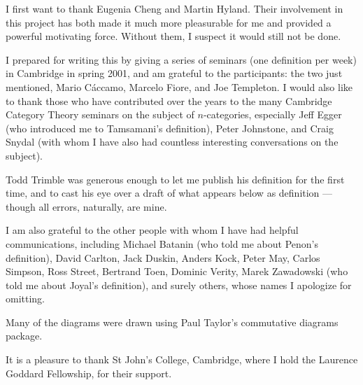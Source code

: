 I first want to thank Eugenia Cheng and Martin Hyland.  Their involvement in
this project has both made it much more pleasurable for me and provided a
powerful motivating force.  Without them, I suspect it would still not be
done.

I prepared for writing this by giving a series of seminars (one definition
per week) in Cambridge in spring 2001, and am grateful to the participants:
the two just mentioned, Mario C\'accamo, Marcelo Fiore, and Joe Templeton.  I
would also like to thank those who have contributed over the years to the
many Cambridge Category Theory seminars on the subject of $n$-categories,
especially Jeff Egger (who introduced me to Tamsamani's definition), Peter
Johnstone, and Craig Snydal (with whom I have also had countless interesting
conversations on the subject).

Todd Trimble was generous enough to let me publish his definition for the
first time, and to cast his eye over a draft of what appears below as
definition ---though all errors, naturally, are mine.

I am also grateful to the other people with whom I have had helpful
communications, including Michael Batanin (who told me about Penon's
definition), David Carlton, Jack Duskin, Anders Kock, Peter May, Carlos
Simpson, Ross Street, Bertrand Toen, Dominic Verity, Marek Zawadowski (who
told me about Joyal's definition), and surely others, whose names I apologize
for omitting.

Many of the diagrams were drawn using Paul Taylor's commutative diagrams
package.

It is a pleasure to thank St John's College, Cambridge, where I hold the
Laurence Goddard Fellowship, for their support. 

\clearpage
